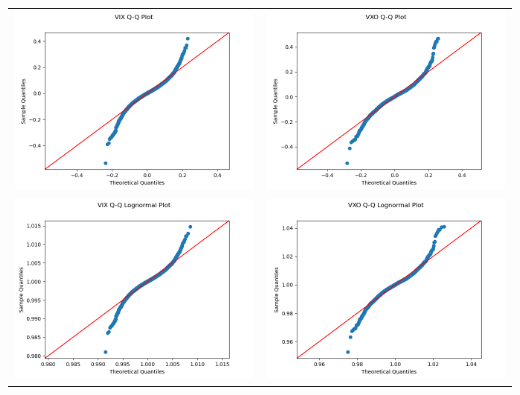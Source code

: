 \documentclass[12pt, a4paper]{article}
\theoremstyle{definition}
\begin{document}
\begin{table}[H]
	\centering
	\begin{tabu}to \textwidth {X[c]X[c]}
\includegraphics[width=75mm]{VIX Q-Q Plot.png} &\includegraphics[width=75mm]{VXO Q-Q Plot.png} \\
\includegraphics[width=75mm]{VIX Q-Q Plot Log.png} &\includegraphics[width=75mm]{VXO Q-Q Plot Log.png} \\

\end{tabu}
\end{table}
\end{document}
